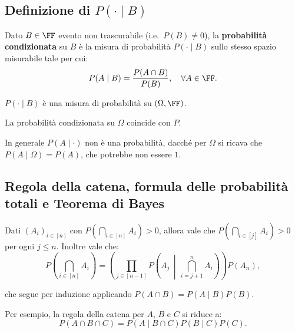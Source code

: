 \begin{multicols*}{2}
    \subsection{Definizione di \texorpdfstring{$P(\cdot \mid B)$}{P(•|B)}}

    \begin{definition}
        Dato $B \in \FF$ evento non trascurabile (i.e.~$P(B) \neq 0$),
        la \textbf{probabilità condizionata} su $B$ è la misura
        di probabilità $P(\cdot \mid B)$ sullo stesso spazio misurabile
        tale per cui:
        \[
            P(A \mid B) = \frac{P(A \cap B)}{P(B)}, \quad \forall A \in \FF.
        \]
    \end{definition}

    \begin{proposition}
        $P(\cdot \mid B)$ è una misura di probabilità su $(\Omega, \FF)$.
    \end{proposition}

    \begin{remark}
        La probabilità condizionata su $\Omega$ coincide con $P$.
    \end{remark}

    \begin{remark}
        In generale $P(A \mid \cdot)$ non è una probabilità, dacché
        per $\Omega$ si ricava che $P(A \mid \Omega) = P(A)$, che
        potrebbe non essere $1$.
    \end{remark}

    \subsection{Regola della catena, formula delle probabilità totali e Teorema di Bayes}

    \begin{lemma}
        Dati $(A_i)_{i \in [n]}$ con $P(\bigcap_{i \in [n]} A_i) > 0$, allora vale che
        $P(\bigcap_{i \in [j]} A_i) > 0$ per ogni $j \leq n$. Inoltre vale che:
        \[ P\left(\bigcap_{i \in [n]} A_i\right) = \left(\prod_{j \in [n-1]} P\left(A_j \,\middle\vert\, \bigcap_{i=j+1}^{n} A_i\right)\right) P(A_n), \]

        che segue per induzione applicando $P(A \cap B) = P(A \mid B) P(B)$.
    \end{lemma}

    \begin{remark}
        Per esempio, la regola della catena per $A$, $B$ e $C$ si riduce
        a:
        \[
            P(A \cap B \cap C) = P(A \mid B \cap C) P(B \mid C) P(C).
        \]
    \end{remark}


\end{multicols*}
